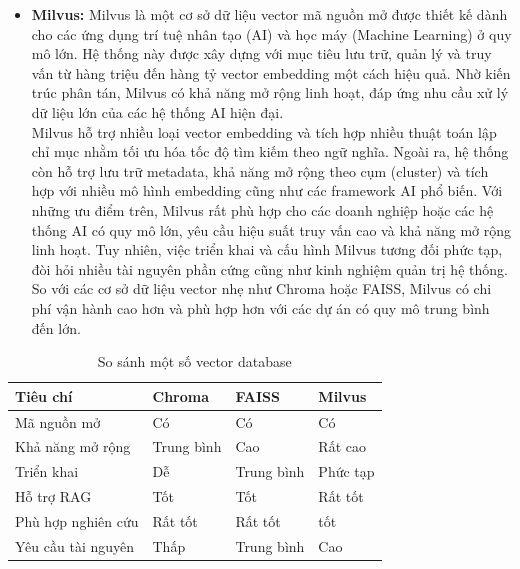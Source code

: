 \documentclass[../DoAn.tex]{subfiles}
\begin{document}
\begin{itemize}[label=-, leftmargin=*]
    \item \textbf{Milvus:} Milvus là một cơ sở dữ liệu vector mã nguồn mở được thiết kế dành cho các ứng dụng trí tuệ nhân tạo (AI) và học máy (Machine Learning) ở quy mô lớn. Hệ thống này được xây dựng với mục tiêu lưu trữ, quản lý và truy vấn từ hàng triệu đến hàng tỷ vector embedding một cách hiệu quả. Nhờ kiến trúc phân tán, Milvus có khả năng mở rộng linh hoạt, đáp ứng nhu cầu xử lý dữ liệu lớn của các hệ thống AI hiện đại.\\
          \hspace*{2em}Milvus hỗ trợ nhiều loại vector embedding và tích hợp nhiều thuật toán lập chỉ mục nhằm tối ưu hóa tốc độ tìm kiếm theo ngữ nghĩa. Ngoài ra, hệ thống còn hỗ trợ lưu trữ metadata, khả năng mở rộng theo cụm (cluster) và tích hợp với nhiều mô hình embedding cũng như các framework AI phổ biến. Với những ưu điểm trên, Milvus rất phù hợp cho các doanh nghiệp hoặc các hệ thống AI có quy mô lớn, yêu cầu hiệu suất truy vấn cao và khả năng mở rộng linh hoạt. Tuy nhiên, việc triển khai và cấu hình Milvus tương đối phức tạp, đòi hỏi nhiều tài nguyên phần cứng cũng như kinh nghiệm quản trị hệ thống. So với các cơ sở dữ liệu vector nhẹ như Chroma hoặc FAISS, Milvus có chi phí vận hành cao hơn và phù hợp hơn với các dự án có quy mô trung bình đến lớn.
\end{itemize}

\begin{table}[H]
    \centering
    \renewcommand{\arraystretch}{1.8} %
    \label{tab:llm_comparison}
    \begin{tabular}{|>{\centering\arraybackslash}m{3.5cm}|>{\centering\arraybackslash}m{4cm}|>{\centering\arraybackslash}m{3cm}|>{\centering\arraybackslash}m{3cm}|}        \hline
        \textbf{Tiêu chí}  & \textbf{Chroma} & \textbf{FAISS} & \textbf{Milvus} \\
        \hline
        Mã nguồn mở        & Có              & Có             & Có              \\
        \hline
        Khả năng mở rộng   & Trung bình      & Cao            & Rất cao         \\
        \hline
        Triển khai         & Dễ              & Trung bình     & Phức tạp        \\
        \hline
        Hỗ trợ RAG         & Tốt             & Tốt            & Rất tốt         \\
        \hline
        Phù hợp nghiên cứu & Rất tốt         & Rất tốt        & tốt             \\
        \hline
        Yêu cầu tài nguyên & Thấp            & Trung bình     & Cao             \\
        \hline
    \end{tabular}
    \caption{So sánh một số vector database}
\end{table}
\end{document}

